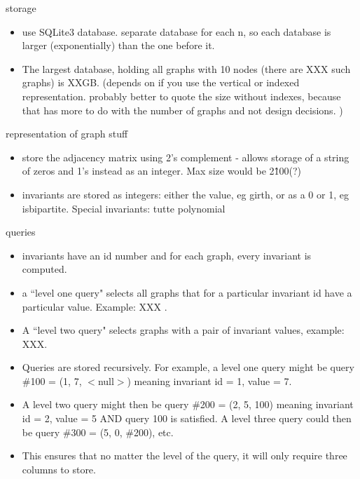 \documentclass[12pt]{article}
\begin{document}
storage
\begin{itemize}
\item  use SQLite3 database. separate database for each n, so each database is larger (exponentially) than the one before it. 
\item The largest database, holding all graphs with 10 nodes (there are XXX such graphs) is XXGB. (depends on if you use the vertical or indexed representation. probably better to quote the size without indexes, because that has more to do with the number of graphs and not design decisions. ) 
\end{itemize}

representation of graph stuff 
\begin{itemize}
\item store the adjacency matrix using 2's complement - allows storage of a string of zeros and 1's instead as an integer.  Max size would be 2\^100(?) 
\item invariants are stored as integers: either the value, eg girth, or as a 0 or 1, eg isbipartite. Special invariants: tutte polynomial 
\end{itemize}

queries 
\begin{itemize}
\item invariants have an id number and for each graph, every invariant is computed.  
\item a ``level one query" selects all graphs that for a particular invariant id have a particular value. Example: XXX . 
\item A ``level two query" selects graphs with a pair of invariant values, example: XXX. 
\item Queries are stored recursively. For example, a level one query might be query \#100 = (1, 7, $<$null$>$) meaning invariant id = 1, value = 7. 
\item A level two query might then be query \#200 = (2, 5, 100) meaning invariant id = 2, value = 5 AND query 100 is satisfied. A level three query could then be query \#300 = (5, 0, \#200), etc. 
\item This ensures that no matter the level of the query, it will only require three columns to store. 
\end{itemize}
\end{document}
